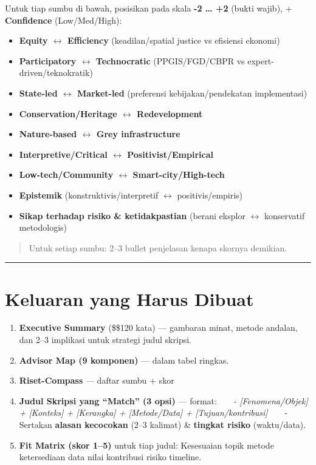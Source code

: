 \documentclass[
  indonesian,
]{article}
\providecommand{\tightlist}{%
  \setlength{\itemsep}{0pt}\setlength{\parskip}{0pt}}
\begin{document}
Untuk tiap sumbu di bawah, posisikan pada skala \textbf{-2 \ldots{} +2}
(bukti wajib), + \textbf{Confidence} (Low/Med/High):

\begin{itemize}
\tightlist
\item
  \textbf{Equity \(\leftrightarrow\) Efficiency} (keadilan/spatial
  justice vs efisiensi ekonomi)
\item
  \textbf{Participatory \(\leftrightarrow\) Technocratic}
  (PPGIS/FGD/CBPR vs expert-driven/teknokratik)
\item
  \textbf{State-led \(\leftrightarrow\) Market-led} (preferensi
  kebijakan/pendekatan implementasi)
\item
  \textbf{Conservation/Heritage \(\leftrightarrow\) Redevelopment}
\item
  \textbf{Nature-based \(\leftrightarrow\) Grey infrastructure}
\item
  \textbf{Interpretive/Critical \(\leftrightarrow\)
  Positivist/Empirical}
\item
  \textbf{Low-tech/Community \(\leftrightarrow\) Smart-city/High-tech}
\item
  \textbf{Epistemik} (konstruktivis/interpretif \(\leftrightarrow\)
  positivis/empiris)
\item
  \textbf{Sikap terhadap risiko \& ketidakpastian} (berani eksplor
  \(\leftrightarrow\) konservatif metodologis)~
\end{itemize}

\begin{quote}
Untuk setiap sumbu: 2--3 bullet penjelasan kenapa skornya demikian.
\end{quote}

\begin{center}\rule{0.5\linewidth}{0.5pt}\end{center}

\section{Keluaran yang Harus Dibuat}\label{keluaran-yang-harus-dibuat}

\begin{enumerate}
\def\labelenumi{\arabic{enumi}.}
\tightlist
\item
  \textbf{Executive Summary} (\$\leq\$120 kata) --- gambaran minat,
  metode andalan, dan 2--3 implikasi untuk strategi judul skripsi.
\item
  \textbf{Advisor Map (9 komponen)} --- dalam tabel ringkas.
\item
  \textbf{Riset-Compass} --- daftar sumbu + skor
\item
  \textbf{Judul Skripsi yang ``Match'' (3 opsi)} --- format: ~ ~ -
  \emph{{[}Fenomena/Objek{]} + {[}Konteks{]} + {[}Kerangka{]} +
  {[}Metode/Data{]} + {[}Tujuan/kontribusi{]}} ~ ~ - Sertakan
  \textbf{alasan kecocokan} (2--3 kalimat) \& \textbf{tingkat risiko}
  (waktu/data).
\item
  \textbf{Fit Matrix (skor 1--5)} untuk tiap judul: Kesesuaian topik
  \textbar{} metode \textbar{} ketersediaan data \textbar{} nilai
  kontribusi \textbar{} risiko timeline.
\end{enumerate}
\end{document}
